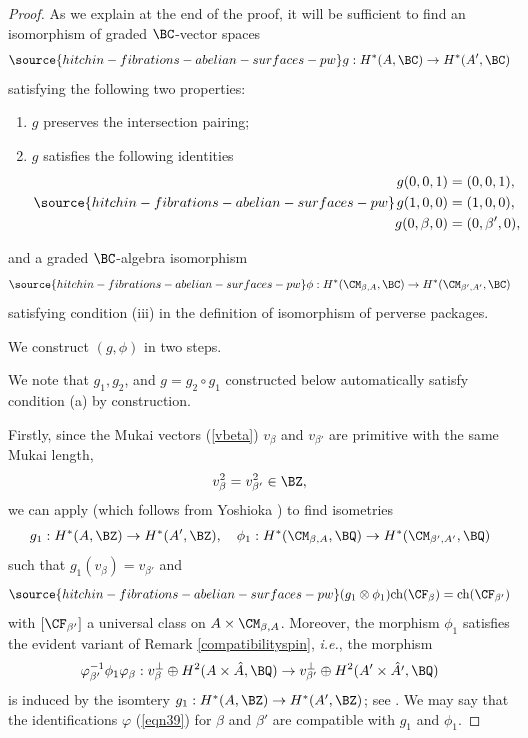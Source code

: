 \begin{proof}

As we explain at the end of the proof, it will be sufficient to find an isomorphism of  graded $\BC$-vector spaces
\begin{equation}\label{39}
\source{hitchin-fibrations-abelian-surfaces-pw}
g: H^*(A, \BC)  \to H^*(A', \BC)
\end{equation}
satisfying the following two properties:
\begin{enumerate}
    \item[(a)] $g$ preserves the intersection pairing;
    \item[(b)] {$g$ satisfies the following identities}
    \begin{equation}\label{40}
\source{hitchin-fibrations-abelian-surfaces-pw}
    \begin{split}
        g(0,0,1) & = (0,0,1),\\
        g(1,0,0) & = (1,0,0),\\
        g(0,\beta,0) & = (0, \beta',0),
    \end{split}
    \end{equation}
\end{enumerate}
and a {graded $\BC$-algebra  isomorphism}
 \begin{equation}\label{fi}
\source{hitchin-fibrations-abelian-surfaces-pw}
 \phi : H^*(\CM_{\beta,A}, \BC) \to H^*(\CM_{\beta', A'}, \BC)
 \end{equation}
satisfying  condition (iii) {in the definition of isomorphism of perverse packages.}

We construct $(g, \phi)$ in two steps.

{We note that $g_1,g_2$, and $ g=g_2\circ g_1$ constructed below automatically satisfy condition (a)
by construction.}

Firstly, since the Mukai vectors (\ref{vbeta})  $v_\beta$ and $v_{\beta'}$ are primitive with the same Mukai length,
\[
v_\beta^2 = v_{\beta'}^2 \in \BZ,
\]
we can apply \cite[Theorem 8.3]{Markman3} (which follows from Yoshioka \cite{Yo}) to find
{isometries}
\[ g_1: H^*(A, \BZ)  \to H^*(A', \BZ) ,\quad \phi_1: H^*(\CM_{\beta,A}, \BQ) \to H^*(\CM_{\beta', A'}, \BQ)\]
such that $g_1(v_\beta) = v_{\beta'}$ and
\begin{equation}\label{eq41}
\source{hitchin-fibrations-abelian-surfaces-pw}
(g_1 \otimes \phi_1) \mathrm{ch}(\CF_\beta) = \mathrm{ch}(\CF_{\beta'})
\end{equation}
with $[\CF_{\beta'}]$ a universal class on $A \times \CM_{\beta,A}$. Moreover, the morphism $\phi_1$ satisfies the evident variant of Remark \ref{compatibilityspin}, \emph{i.e.}, the morphism
\[
\varphi_{\beta'}^{-1}\phi_1 \varphi_\beta: v_\beta^\perp \oplus H^2(A\times \hat{A},\BQ)
\to v_{\beta'}^\perp \oplus H^2(A'\times \hat{A'},\BQ)
\]
is induced by the isomtery $g_1: H^*(A, \BZ) \to H^*(A', \BZ)$; see  \cite[Proposition 8.5]{Markman2}. We may say that the identifications $\varphi$ (\ref{eqn39}) for $\beta$ and $\beta'$ are compatible with $g_1$ and $\phi_1$.



\end{proof}
